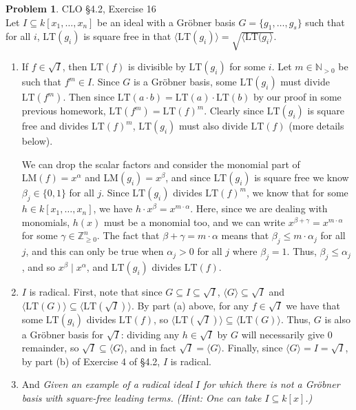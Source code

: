 \documentclass[12pt]{amsart}
\theoremstyle{definition}
\newtheorem{prob}{Problem}
\begin{document}
\begin{flushleft}
\newpage{}
\begin{prob}  CLO \S4.2, Exercise 16 \smallskip \\
Let $I \subseteq k[x_1,\dots,x_n]$ be an ideal with a Gr\"obner basis $G = \{g_1,\dots,g_s\}$ such that for all $i$, $\text{LT}(g_i)$ is square free in that $\langle \text{LT}(g_i)\rangle = \sqrt{\langle\text{LT}(g_i\rangle}$.
\begin{enumerate}
    \item[(a)] If $f \in \sqrt{I}$, then $\mathrm{LT}(f)$ is divisible by $\text{LT}(g_i)$ for some $i$. Let $m \in \mathbb N_{>0}$ be such that $f^m \in I$. Since $G$ is a Gr\"obner basis, some $\mathrm{LT}(g_i)$ must divide $\text{LT}(f^m)$. Then since $\text{LT}(a\cdot b) = \text{LT}(a)\cdot \text{LT}(b)$ by our proof in some previous homework, $\text{LT}(f^m) = \text{LT}(f)^m$. Clearly since $\text{LT}(g_i)$ is square free and divides $\text{LT}(f)^m$, $\text{LT}(g_i)$ must also divide $\text{LT}(f)$ (more details below).
    
    We can drop the scalar factors and consider the monomial part of $\text{LM}(f) = x^\alpha$ and $\text{LM}(g_i) = x^\beta$, and since $\text{LT}(g_i)$ is square free we know $\beta_j \in \{0,1\}$ for all $j$. Since $\text{LT}(g_i)$ divides $\text{LT}(f)^m$, we know that for some $h \in k[x_1,\dots,x_n]$, we have $h\cdot x^{\beta} = x^{m \cdot \alpha}$. Here, since we are dealing with monomials, $h(x)$ must be a monomial too, and we can write $x^{\beta+\gamma} = x^{m \cdot \alpha}$ for some $\gamma \in \mathbb Z^n_{\ge 0}$. The fact that $\beta + \gamma = m\cdot \alpha$ means that $\beta_j\le m \cdot \alpha_j$ for all $j$, and this can only be true when $\alpha_j > 0$ for all $j$ where $\beta_j =1$. Thus, $\beta_j \le \alpha_j$, and so $x^\beta \mid x^\alpha$, and $\text{LT}(g_i)$ divides $\text{LT}(f)$.
    
    
    \item[(b)] $I$ is radical. First, note that since $G \subseteq I\subseteq \sqrt I$, $\langle G \rangle \subseteq \sqrt I$ and $\langle \text{LT}(G)\rangle \subseteq \langle \text{LT}(\sqrt I)\rangle$. By part (a) above, for any $f \in \sqrt I$ we have that some $\text{LT}(g_i)$ divides $\text{LT}(f)$, so $\langle \text{LT}(\sqrt I)\rangle \subseteq \langle \text{LT}(G)\rangle $. Thus, $G$ is also a Gr\"obner basis for $\sqrt I$: dividing any $h \in \sqrt I$ by $G$ will necessarily give 0 remainder, so $\sqrt{I} \subseteq \langle G \rangle$, and in fact $\sqrt I = \langle G\rangle$. Finally, since $\langle G\rangle = I = \sqrt{I}$, by part (b) of Exercise 4 of \S4.2, $I$ is radical.
    \item[(c)] And \emph{Given an example of a radical ideal $I$ for which there is \emph{not} a Gr\"obner basis with square-free leading terms. 
(\emph{Hint}: One can take $I\subseteq k[x]$.)} 


\end{enumerate}
\end{prob}
\end{flushleft}
\end{document}
